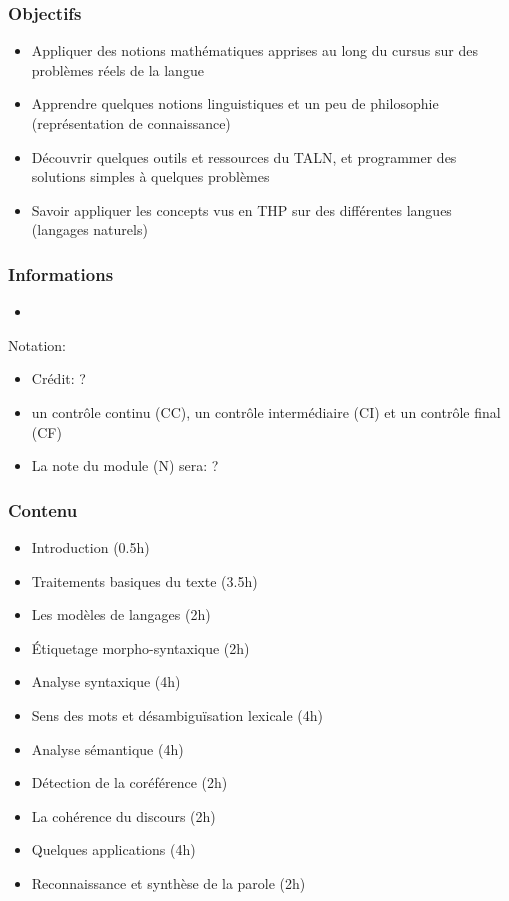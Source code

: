 \documentclass{beamer}
\begin{document}
\begin{frame}
\frametitle{Objectifs}

\begin{itemize}
	\item Appliquer des notions mathématiques apprises au long du cursus sur des problèmes réels de la langue 
	\item Apprendre quelques notions linguistiques et un peu de philosophie (représentation de connaissance) 
	\item Découvrir quelques outils et ressources du TALN, et programmer des solutions simples à quelques problèmes
	\item Savoir appliquer les concepts vus en THP sur des différentes langues (langages naturels)
\end{itemize}

\end{frame}


\begin{frame}
\frametitle{Informations}

\begin{itemize}
	\item 
\end{itemize}

Notation:
\begin{itemize}
	\item Crédit: ?
	\item un contrôle continu (CC), un contrôle intermédiaire (CI) et un contrôle final (CF)
	\item La note du module (N) sera: ?
\end{itemize}

\end{frame}

\begin{frame}
\frametitle{Contenu }

\begin{itemize}
	\item Introduction (0.5h)
	\item Traitements basiques du texte (3.5h)
	\item Les modèles de langages (2h)
	\item Étiquetage morpho-syntaxique (2h)
	\item Analyse syntaxique (4h)
	\item Sens des mots et désambiguïsation lexicale (4h)
	\item Analyse sémantique (4h)
	\item Détection de la coréférence (2h)
	\item La cohérence du discours (2h)
	\item \color{red} Quelques applications (4h)
	\item \color{red} Reconnaissance et synthèse de la parole (2h)
\end{itemize}

\end{frame}
\end{document}
